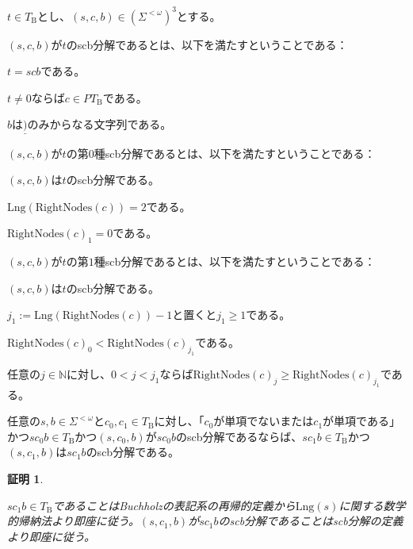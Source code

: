 \documentclass[dvipdfmx,uplatex]{jsarticle}
\theoremstyle{customnonumberbreakfortheorem}
\theoremstyle{customnonumberbreakforproof}
\newtheorem{hideableproof}{証明}
\begin{document}
\(t \in T_{\textrm{B}}\)とし、\((s,c,b) \in (\Sigma^{< \omega})^3\)とする。
\begin{nenumerate}
	\item \((s,c,b)\)が\(t\)のscb分解であるとは、以下を満たすということである：
	\begin{nenumerate}
		\item \(t = scb\)である。
		\item \(t \neq 0\)ならば\(c \in PT_{\textrm{B}}\)である。
		\item \(b\)は\(\underline{)}\)のみからなる文字列である。
	\end{nenumerate}
	\item \((s,c,b)\)が\(t\)の第\(0\)種scb分解であるとは、以下を満たすということである：
	\begin{nenumerate}
		\item \((s,c,b)\)は\(t\)のscb分解である。
		\item \(\textrm{Lng}(\textrm{RightNodes}(c)) = 2\)である。
		\item \(\textrm{RightNodes}(c)_1 = 0\)である。
	\end{nenumerate}
	\item \((s,c,b)\)が\(t\)の第\(1\)種scb分解であるとは、以下を満たすということである：
	\begin{nenumerate}
		\item \((s,c,b)\)は\(t\)のscb分解である。
		\item \(j_1 := \textrm{Lng}(\textrm{RightNodes}(c))-1\)と置くと\(j_1 \geq 1\)である。
		\item \(\textrm{RightNodes}(c)_0 < \textrm{RightNodes}(c)_{j_1}\)である。
		\item 任意の\(j \in \mathbb{N}\)に対し、\(0 < j < j_1\)ならば\(\textrm{RightNodes}(c)_j \geq \textrm{RightNodes}(c)_{j_1}\)である。
	\end{nenumerate}
\end{nenumerate}

\begin{proposition}[scb分解の置換可能性]\label{scb分解の置換可能性}
	任意の\(s,b \in \Sigma^{< \omega}\)と\(c_0, c_1 \in T_{\textrm{B}}\)に対し、「\(c_0\)が単項でないまたは\(c_1\)が単項である」かつ\(s c_0 b \in T_{\textrm{B}}\)かつ\((s,c_0,b)\)が\(s c_0 b\)のscb分解であるならば、\(s c_1 b \in T_{\textrm{B}}\)かつ\((s,c_1,b)\)は\(s c_1 b\)のscb分解である。
\end{proposition}

\begin{hideableproof}
	\begin{indented}
		\item \(s c_1 b \in T_{\textrm{B}}\)であることはBuchholzの表記系の再帰的定義から\(\textrm{Lng}(s)\)に関する数学的帰納法より即座に従う。\((s,c_1,b)\)が\(s c_1 b\)のscb分解であることはscb分解の定義より即座に従う。
	\end{indented}
\end{hideableproof}
\end{document}

